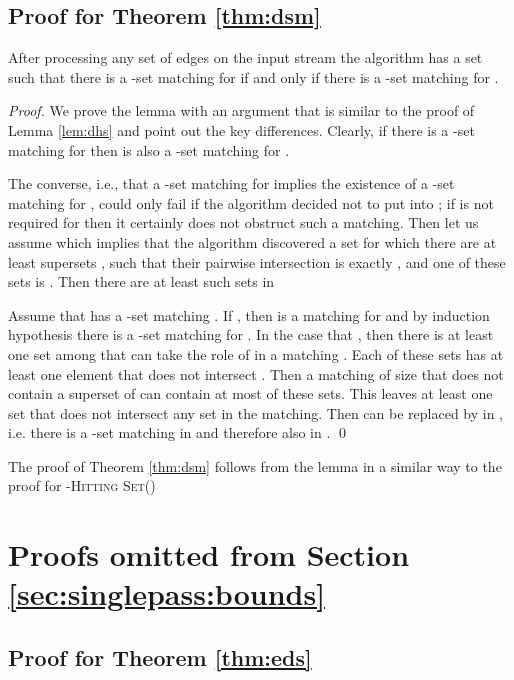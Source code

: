 \documentclass[draft,a4paper]{llncs}
\newcommand{\dHSk}{-\textsc{Hitting Set()}\xspace}
\begin{document}
\subsection{Proof for Theorem \ref{thm:dsm}}

\begin{lemma}
 After processing any set  of edges on the input stream the algorithm has a set  such that there is a -set matching  for  if and only if there is a -set matching  for .
\end{lemma}

\begin{proof}
 We prove the lemma with an argument that is similar to the proof of Lemma \ref{lem:dhs} and point out the key differences. 
 Clearly, if there is a -set matching  for  then  is also a -set matching for .
 
 The converse, i.e., that a -set matching  for  implies the existence of a -set matching  for , could only fail if the algorithm decided not to put  into ;
 if  is not required for  then it certainly does not obstruct such a matching. 
 Then let us assume  which implies that the algorithm discovered a set  for which there are
 at least  supersets , such that their pairwise intersection is exactly , and one of these sets is .
 Then there are at least  such sets in 
 
 Assume that  has a -set matching . If , then  is a matching for  and by induction hypothesis there is a -set matching  for . In the case that , then there is at least one set among  that can take the role of  in a matching . Each of these sets has at least one element that does not intersect . Then a matching of size  that does not contain a superset of  can contain at most  of these sets. This leaves at least one set  that does not intersect any set in the  matching. Then  can be replaced by  in , i.e. there is a -set matching in  and therefore also in . \qed \end{proof}
 
 The proof of Theorem \ref{thm:dsm} follows from the lemma in a similar way to the proof for \dHSk

\section{Proofs omitted from Section \ref{sec:singlepass:bounds}}
\subsection{Proof for Theorem \ref{thm:eds}}
\end{document}
